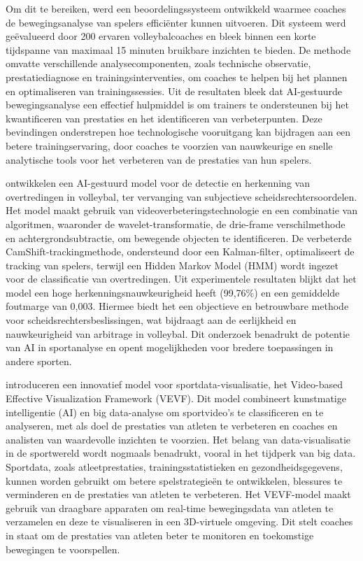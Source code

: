 Om dit te bereiken, werd een beoordelingssysteem ontwikkeld waarmee coaches de bewegingsanalyse van spelers efficiënter kunnen uitvoeren. Dit systeem werd geëvalueerd door 200 ervaren volleybalcoaches en bleek binnen een korte tijdspanne van maximaal 15 minuten bruikbare inzichten te bieden. De methode omvatte verschillende analysecomponenten, zoals technische observatie, prestatiediagnose en trainingsinterventies, om coaches te helpen bij het plannen en optimaliseren van trainingssessies.
Uit de resultaten bleek dat AI-gestuurde bewegingsanalyse een effectief hulpmiddel is om trainers te ondersteunen bij het kwantificeren van prestaties en het identificeren van verbeterpunten.
Deze bevindingen onderstrepen hoe technologische vooruitgang kan bijdragen aan een betere trainingservaring, door coaches te voorzien van nauwkeurige en snelle analytische tools voor het verbeteren van de prestaties van hun spelers.

\textcite{Huang2023} ontwikkelen een AI-gestuurd model voor de detectie en herkenning van overtredingen in volleybal, ter vervanging van subjectieve scheidsrechtersoordelen. Het model maakt gebruik van videoverbeteringstechnologie en een combinatie van algoritmen, waaronder de wavelet-transformatie, de drie-frame verschilmethode en achtergrondsubtractie, om bewegende objecten te identificeren. De verbeterde CamShift-trackingmethode, ondersteund door een Kalman-filter, optimaliseert de tracking van spelers, terwijl een Hidden Markov Model (HMM) wordt ingezet voor de classificatie van overtredingen.
Uit experimentele resultaten blijkt dat het model een hoge herkenningsnauwkeurigheid heeft (99,76\%) en een gemiddelde foutmarge van 0,003. Hiermee biedt het een objectieve en betrouwbare methode voor scheidsrechtersbeslissingen, wat bijdraagt aan de eerlijkheid en nauwkeurigheid van arbitrage in volleybal. Dit onderzoek benadrukt de potentie van AI in sportanalyse en opent mogelijkheden voor bredere toepassingen in andere sporten.

\textcite{Liu2023} introduceren een innovatief model voor sportdata-visualisatie, het Video-based Effective Visualization Framework (VEVF). Dit model combineert kunstmatige intelligentie (AI) en big data-analyse om sportvideo's te classificeren en te analyseren, met als doel de prestaties van atleten te verbeteren en coaches en analisten van waardevolle inzichten te voorzien.
Het belang van data-visualisatie in de sportwereld wordt nogmaals benadrukt, vooral in het tijdperk van big data. Sportdata, zoals atleetprestaties, trainingsstatistieken en gezondheidsgegevens, kunnen worden gebruikt om betere spelstrategieën te ontwikkelen, blessures te verminderen en de prestaties van atleten te verbeteren. Het VEVF-model maakt gebruik van draagbare apparaten om real-time bewegingsdata van atleten te verzamelen en deze te visualiseren in een 3D-virtuele omgeving. Dit stelt coaches in staat om de prestaties van atleten beter te monitoren en toekomstige bewegingen te voorspellen.

